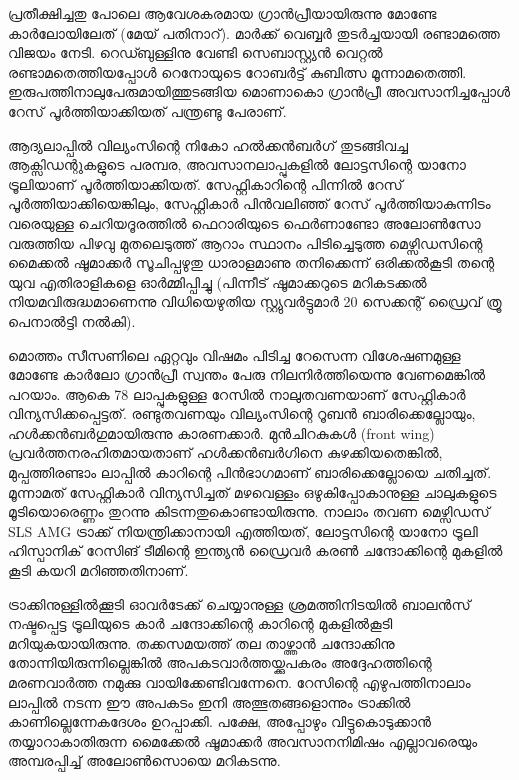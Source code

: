 \vskip 2pt

പ്രതീക്ഷിച്ചതു പോലെ ആവേശകരമായ ഗ്രാന്‍പ്രീയായിരുന്നു മോണ്ടേ കാര്‍ലോയിലേത് (മേയ് പതിനാറ്). മാര്‍ക്ക് 
വെബ്ബര്‍ തുടര്‍ച്ചയായി രണ്ടാമത്തെ വിജയം നേടി. റെഡ്ബുള്ളിനു വേണ്ടി സെബാസ്റ്റ്യന്‍ വെറ്റല്‍ രണ്ടാമതെത്തിയപ്പോള്‍ 
റെനോയുടെ റോബര്‍ട്ട് കുബിത്സ മൂന്നാമതെത്തി. ഇരുപത്തിനാലുപേരുമായിത്തുടങ്ങിയ മൊണാകൊ ഗ്രാന്‍പ്രീ 
അവസാനിച്ചപ്പോള്‍ റേസ് പൂര്‍ത്തിയാക്കിയത് പന്ത്രണ്ടു പേരാണ്.

ആദ്യലാപ്പില്‍ വില്യംസിന്റെ നികോ ഹല്‍ക്കന്‍ബര്‍ഗ് തുടങ്ങിവച്ച ആക്സിഡന്റുകളുടെ പരമ്പര, അവസാനലാപ്പുകളില്‍ 
ലോട്ടസിന്റെ യാനോ ട്രൂലിയാണ് പൂര്‍ത്തിയാക്കിയത്. സേഫ്റ്റികാറിന്റെ പിന്നില്‍ റേസ് പൂര്‍ത്തിയാക്കിയെങ്കിലും, 
സേഫ്റ്റികാര്‍ പിന്‍വലിഞ്ഞ് റേസ് പൂര്‍ത്തിയാകുന്നിടം വരെയുള്ള ചെറിയദൂരത്തില്‍ ഫെറാരിയുടെ ഫെര്‍ണാണ്ടോ 
അലോണ്‍സോ വരുത്തിയ പിഴവു മുതലെടുത്ത് ആറാം സ്ഥാനം പിടിച്ചെടുത്ത മെഴ്സിഡസിന്റെ മൈക്കല്‍ ഷൂമാക്കര്‍ 
സൂചിപ്പഴുതു ധാരാളമാണു തനിക്കെന്ന് ഒരിക്കല്‍കൂടി തന്റെ യുവ എതിരാളികളെ ഓര്‍മ്മിപ്പിച്ചു (പിന്നീട് ഷൂമാക്കറുടെ 
മറികടക്കല്‍ നിയമവിരുദ്ധമാണെന്നു വിധിയെഴുതിയ സ്റ്റ്യുവര്‍ട്ടുമാര്‍ 20 സെക്കന്റ് ഡ്രൈവ് ത്രൂ പെനാല്‍ട്ടി നല്‍കി).

മൊത്തം സീസണിലെ ഏറ്റവും വിഷമം പിടിച്ച റേസെന്ന വിശേഷണമുള്ള മോണ്ടേ കാര്‍ലോ ഗ്രാന്‍പ്രീ സ്വന്തം പേരു 
നിലനിര്‍ത്തിയെന്നു വേണമെങ്കില്‍ പറയാം. ആകെ 78 ലാപ്പുകളുള്ള റേസില്‍ നാലുതവണയാണ് സേഫ്റ്റികാര്‍ 
വിന്യസിക്കപ്പെട്ടത്. രണ്ടുതവണയും വില്യംസിന്റെ റൂബന്‍ ബാരിക്കെല്ലോയും, ഹള്‍ക്കന്‍ബര്‍ഗുമായിരുന്നു കാരണക്കാര്‍. 
മുന്‍ചിറകുകള്‍ (front wing) പ്രവര്‍ത്തനരഹിതമായതാണ് ഹള്‍ക്കന്‍ബര്‍ഗിനെ കുഴക്കിയതെങ്കില്‍, മുപ്പത്തിരണ്ടാം 
ലാപ്പില്‍ കാറിന്റെ പിന്‍ഭാഗമാണ് ബാരിക്കെല്ലോയെ ചതിച്ചത്. മൂന്നാമത് സേഫ്റ്റികാര്‍ വിന്യസിച്ചത് മഴവെള്ളം 
ഒഴുകിപ്പോകാനുള്ള ചാലുകളുടെ മൂടിയൊരെണ്ണം തുറന്നു കിടന്നതുകൊണ്ടായിരുന്നു. നാലാം തവണ മെഴ്സിഡസ് 
SLS AMG ട്രാക്ക് നിയന്ത്രിക്കാനായി എത്തിയത്, ലോട്ടസിന്റെ യാനോ ട്രൂലി ഹിസ്പാനിക് റേസിങ് ടീമിന്റെ ഇന്ത്യന്‍ 
ഡ്രൈവര്‍ കരണ്‍ ചന്ദോക്കിന്റെ മുകളില്‍ കൂടി കയറി മറിഞ്ഞതിനാണ്.

ട്രാക്കിനുള്ളില്‍ക്കൂടി ഓവര്‍ടേക്ക് ചെയ്യാനുള്ള ശ്രമത്തിനിടയില്‍ ബാലന്‍സ് നഷ്ടപ്പെട്ട ട്രൂലിയുടെ കാര്‍ ചന്ദോക്കിന്റെ 
കാറിന്റെ മുകളില്‍കൂടി മറിയുകയായിരുന്നു. തക്കസമയത്ത് തല താഴ്ത്താന്‍ ചന്ദോക്കിനു തോന്നിയിരുന്നില്ലെങ്കില്‍ 
അപകടവാര്‍ത്തയ്ക്കുപകരം അദ്ദേഹത്തിന്റെ മരണവാര്‍ത്ത നമുക്കു വായിക്കേണ്ടിവന്നേനെ. റേസിന്റെ എഴുപത്തിനാലാം 
ലാപ്പില്‍ നടന്ന ഈ അപകടം ഇനി അത്ഭുതങ്ങളൊന്നും ട്രാക്കില്‍ കാണില്ലെന്നേകദേശം ഉറപ്പാക്കി. പക്ഷേ, അപ്പോഴും 
വിട്ടുകൊടുക്കാന്‍ തയ്യാറാകാതിരുന്ന മൈക്കേല്‍ ഷൂമാക്കര്‍ അവസാനനിമിഷം എല്ലാവരെയും അമ്പരപ്പിച്ച് 
അലോണ്‍സൊയെ മറികടന്നു.

